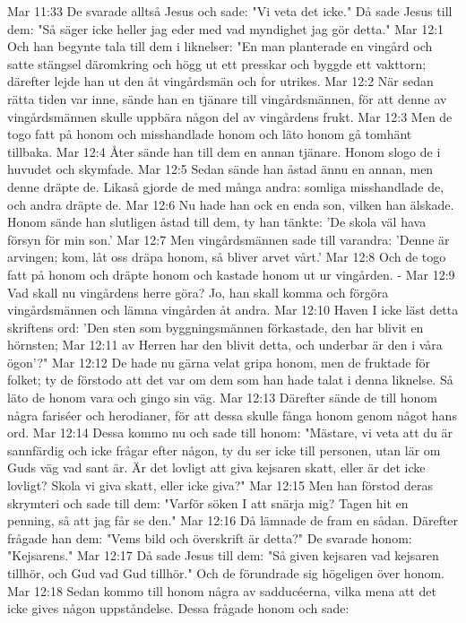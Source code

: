 Mar 11:33  De svarade alltså Jesus och sade: "Vi veta det icke." Då sade Jesus till dem: "Så säger icke heller jag eder med vad myndighet jag gör detta."
Mar 12:1  Och han begynte tala till dem i liknelser: "En man planterade en vingård och satte stängsel däromkring och högg ut ett presskar och byggde ett vakttorn; därefter lejde han ut den åt vingårdsmän och for utrikes.
Mar 12:2  När sedan rätta tiden var inne, sände han en tjänare till vingårdsmännen, för att denne av vingårdsmännen skulle uppbära någon del av vingårdens frukt.
Mar 12:3  Men de togo fatt på honom och misshandlade honom och läto honom gå tomhänt tillbaka.
Mar 12:4  Åter sände han till dem en annan tjänare. Honom slogo de i huvudet och skymfade.
Mar 12:5  Sedan sände han åstad ännu en annan, men denne dräpte de. Likaså gjorde de med många andra: somliga misshandlade de, och andra dräpte de.
Mar 12:6  Nu hade han ock en enda son, vilken han älskade. Honom sände han slutligen åstad till dem, ty han tänkte: 'De skola väl hava försyn för min son.'
Mar 12:7  Men vingårdsmännen sade till varandra: 'Denne är arvingen; kom, låt oss dräpa honom, så bliver arvet vårt.'
Mar 12:8  Och de togo fatt på honom och dräpte honom och kastade honom ut ur vingården. -
Mar 12:9  Vad skall nu vingårdens herre göra? Jo, han skall komma och förgöra vingårdsmännen och lämna vingården åt andra.
Mar 12:10  Haven I icke läst detta skriftens ord: 'Den sten som byggningsmännen förkastade, den har blivit en hörnsten;
Mar 12:11  av Herren har den blivit detta, och underbar är den i våra ögon'?"
Mar 12:12  De hade nu gärna velat gripa honom, men de fruktade för folket; ty de förstodo att det var om dem som han hade talat i denna liknelse. Så läto de honom vara och gingo sin väg.
Mar 12:13  Därefter sände de till honom några fariséer och herodianer, för att dessa skulle fånga honom genom något hans ord.
Mar 12:14  Dessa kommo nu och sade till honom: "Mästare, vi veta att du är sannfärdig och icke frågar efter någon, ty du ser icke till personen, utan lär om Guds väg vad sant är. Är det lovligt att giva kejsaren skatt, eller är det icke lovligt? Skola vi giva skatt, eller icke giva?"
Mar 12:15  Men han förstod deras skrymteri och sade till dem: "Varför söken I att snärja mig? Tagen hit en penning, så att jag får se den."
Mar 12:16  Då lämnade de fram en sådan. Därefter frågade han dem: "Vems bild och överskrift är detta?" De svarade honom: "Kejsarens."
Mar 12:17  Då sade Jesus till dem: "Så given kejsaren vad kejsaren tillhör, och Gud vad Gud tillhör." Och de förundrade sig högeligen över honom.
Mar 12:18  Sedan kommo till honom några av sadducéerna, vilka mena att det icke gives någon uppståndelse. Dessa frågade honom och sade:
